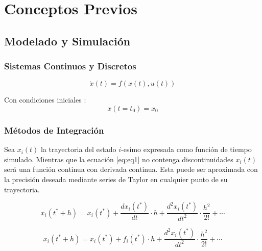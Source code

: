 \documentclass{beamer}
\begin{document}
\chapter{Conceptos Previos}
\section{Modelado y Simulación}
\subsection{Sistemas Continuos y Discretos}
\begin{frame}
	\begin{equation} \label{eq:eq1}
	\dot{x}(t) = f (x(t), u(t))
	\end{equation}

	Con condiciones iniciales :
	\begin{equation} \label{eq:eq2}
	x(t = t_0 ) = x_0
	\end{equation}
\end{frame}

\subsection{Métodos de Integración}
\begin{frame}
	Sea $x_i (t)$ la trayectoria del estado $i$-esimo expresada como función de tiempo simulado. 
	Mientras que la ecuación  \ref{eq:eq1} no contenga discontinuidades $x_i (t)$ será una función continua con derivada continua. 
	Esta puede ser aproximada con la precisión deseada mediante series de Taylor en cualquier punto de su trayectoria.

	\begin{equation} \label{eq3}
		x_i(t^* + h) = x_i(t^*) + \frac{dx_i (t^*)}{dt} \cdot h + \frac{d^{2}x_i (t^*)}{dt^2} \cdot \frac{h^2}{2!} + \cdots
	\end{equation}

	\begin{equation} \label{eq4}
		x_i(t^* + h) = x_i(t^*) + f_i(t^*) \cdot h + \frac{d^{2}x_i (t^*)}{dt^2} \cdot \frac{h^2}{2!} + \cdots
	\end{equation}
\end{frame}
\end{document}
